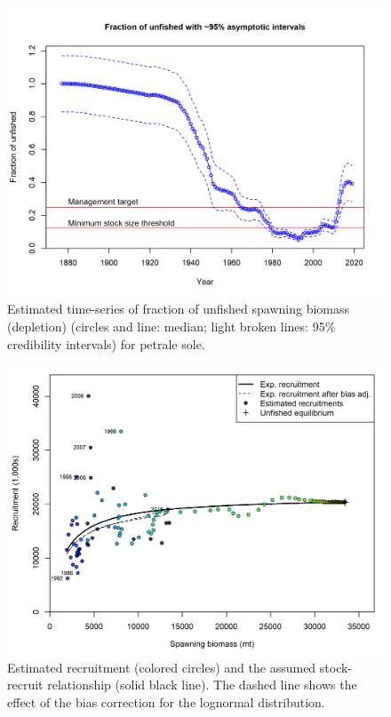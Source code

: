 \documentclass[12pt,]{article}
\begin{document}
\FloatBarrier

\begin{figure}
\centering
\includegraphics{r4ss/plots_mod1/ts9_Fraction_of_unfished_with_95_asymptotic_intervals_intervals.png}
\caption{Estimated time-series of fraction of unfished spawning biomass
(depletion) (circles and line: median; light broken lines: 95\%
credibility intervals) for petrale sole. \label{fig:depl}}
\end{figure}

\FloatBarrier

\begin{figure}
\centering
\includegraphics{r4ss/plots_mod1/SR_curve2.png}
\caption{Estimated recruitment (colored circles) and the assumed
stock-recruit relationship (solid black line). The dashed line shows the
effect of the bias correction for the lognormal distribution.
\label{fig:stock_recruit_curve}}
\end{figure}
\end{document}
